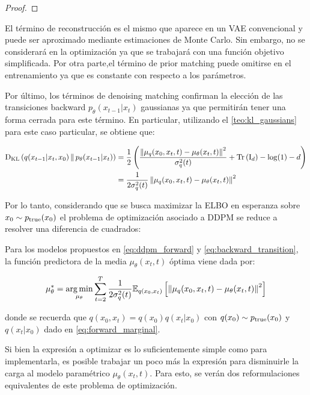 \begin{proof}
\end{proof}

El término de reconstrucción es el mismo que aparece en un VAE convencional y puede ser aproximado mediante estimaciones de Monte Carlo. Sin embargo, no se considerará en la optimización ya que se trabajará con una función objetivo simplificada. Por otra parte,el término de prior matching puede omitirse en el entrenamiento ya que es constante con respecto a los parámetros.

Por último, los términos de denoising matching confirman la elección de las transiciones backward $p_\theta(x_{t-1}|x_t)$ gaussianas ya que permitirán tener una forma cerrada para este término. En particular, utilizando el \autoref{teo:kl_gaussians} para este caso particular, se obtiene que:

\begin{align}
    \operatorname{D_{KL}}\left(q(x_{t-1}|x_t,x_0)\,\|\,p_\theta(x_{t-1}|x_t)\right) & = \frac{1}{2}\left(\frac{\left\lVert \mu_q(x_0,x_t, t)-\mu_\theta(x_t,t) \right\rVert^2}{\sigma_q^2(t)}+\operatorname{Tr}\left(\operatorname{I}_{d}\right)-\log(1)-d\right) \\
                                                   & = \frac{1}{2\sigma_q^2(t)} \left\lVert \mu_q(x_0,x_t, t)-\mu_\theta(x_t,t) \right\rVert^2
\end{align}

Por lo tanto, considerando que se busca maximizar la ELBO en esperanza sobre $x_0\sim p_{\operatorname{true}}(x_0)$ el problema de optimización asociado a DDPM se reduce a resolver una diferencia de cuadrados:

\begin{prop}
    \label{prop:mu_prediction}

    Para los modelos propuestos en \eqref{eq:ddpm_forward} y \eqref{eq:backward_transition}, la función predictora de la media $\mu_\theta(x_t,t)$ óptima viene dada por:

    \begin{equation}
        \mu_\theta^* = \operatorname*{arg\,min}_{\mu_\theta} \sum_{t=2}^T \frac{1}{2\sigma_q^2(t)} \mathbb{E}_{q(x_0,x_t)}\left[\left\lVert \mu_q(x_0,x_t, t)-\mu_\theta(x_t,t) \right\rVert^2\right]
    \end{equation}

    donde se recuerda que $q(x_0,x_t)=q(x_0)q(x_t|x_0)$ con $q(x_0)\sim p_{\operatorname{true}}(x_0)$ y $q(x_t|x_0)$ dado en \eqref{eq:forward_marginal}.
\end{prop}

Si bien la expresión a optimizar es lo suficientemente simple como para implementarla, es posible trabajar un poco más la expresión para disminuirle la carga al modelo paramétrico $\mu_\theta(x_t,t)$. Para esto, se verán dos reformulaciones equivalentes de este problema de optimización.

